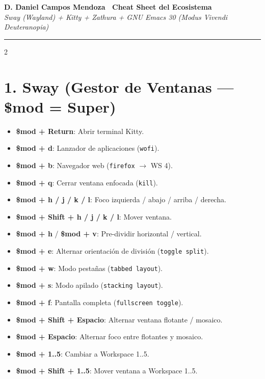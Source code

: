 \documentclass[11pt,article,spanish]{apuntes-scr}
\begin{document}
\pagestyle{empty}
\thispagestyle{empty}
\begin{center}
  {\Large\rmfamily\bfseries D. Daniel Campos Mendoza \textemdash\ Cheat Sheet del Ecosistema} \\[0.3em]
  {\small\rmfamily\itshape\color{MidnightBlue} Sway (Wayland) + Kitty + Zathura + GNU Emacs 30 (Modus Vivendi Deuteranopia)}
\end{center}
\vspace{0.4em}
\hrule
\vspace{0.6em}

\begin{multicols*}{2}

  \section*{1. Sway (Gestor de Ventanas — \$mod = Super)}
  \begin{itemize}[leftmargin=*]
    \item \textbf{\$mod + Return}: Abrir terminal Kitty.
    \item \textbf{\$mod + d}: Lanzador de aplicaciones (\texttt{wofi}).
    \item \textbf{\$mod + b}: Navegador web (\texttt{firefox} $\to$ WS 4).
    \item \textbf{\$mod + q}: Cerrar ventana enfocada (\texttt{kill}).
    \item \textbf{\$mod + h / j / k / l}: Foco izquierda / abajo / arriba / derecha.
    \item \textbf{\$mod + Shift + h / j / k / l}: Mover ventana.
    \item \textbf{\$mod + h} / \textbf{\$mod + v}: Pre-dividir horizontal / vertical.
    \item \textbf{\$mod + e}: Alternar orientación de división (\texttt{toggle split}).
    \item \textbf{\$mod + w}: Modo pestañas (\texttt{tabbed layout}).
    \item \textbf{\$mod + s}: Modo apilado (\texttt{stacking layout}).
    \item \textbf{\$mod + f}: Pantalla completa (\texttt{fullscreen toggle}).
    \item \textbf{\$mod + Shift + Espacio}: Alternar ventana flotante / mosaico.
    \item \textbf{\$mod + Espacio}: Alternar foco entre flotantes y mosaico.
    \item \textbf{\$mod + 1..5}: Cambiar a Workspace 1..5.
    \item \textbf{\$mod + Shift + 1..5}: Mover ventana a Workspace 1..5.

\end{itemize}
\end{multicols*}
\end{document}
